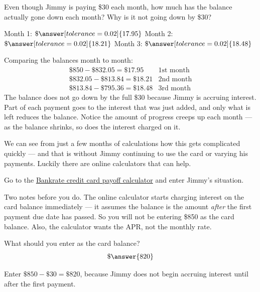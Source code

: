 \documentclass[12pt]{ximera}
\begin{document}
\begin{problem}
Even though Jimmy is paying \$30 each month, how much has the balance actually gone
down each month? Why is it not going down by \$30?

Month 1: $\$\answer[tolerance=0.02]{17.95}$ \qquad
Month 2: $\$\answer[tolerance=0.02]{18.21}$ \qquad
Month 3: $\$\answer[tolerance=0.02]{18.48}$

\begin{freeResponse}
\end{freeResponse}

\begin{solution}
Comparing the balances month to month:
\[
\begin{array}{ll}
\$850 - \$832.05 = \$17.95 & \text{1st month} \\
\$832.05 - \$813.84 = \$18.21 & \text{2nd month} \\
\$813.84 - \$795.36 = \$18.48 & \text{3rd month}
\end{array}
\]
The balance does not go down by the full \$30 because Jimmy is accruing interest.
Part of each payment goes to the interest that was just added, and only what is left
reduces the balance. Notice the amount of progress creeps up each month --- as the
balance shrinks, so does the interest charged on it.
\end{solution}
\end{problem}

We can see from just a few months of calculations how this gets complicated quickly
--- and that is without Jimmy continuing to use the card or varying his payments.
Luckily there are online calculators that can help.

\begin{problem}
Go to the
\href{https://www.bankrate.com/calculators/credit-cards/credit-card-payoff-calculator.aspx}{Bankrate
credit card payoff calculator} and enter Jimmy's situation.

Two notes before you do. The online calculator starts charging interest on the card
balance immediately --- it assumes the balance is the amount \emph{after} the first
payment due date has passed. So you will not be entering \$850 as the card balance.
Also, the calculator wants the APR, not the monthly rate.

What should you enter as the card balance?
\[
\$\answer{820}
\]

\begin{solution}
Enter $\$850 - \$30 = \$820$, because Jimmy does not begin accruing interest until
after the first payment.
\end{solution}
\end{problem}
\end{document}
